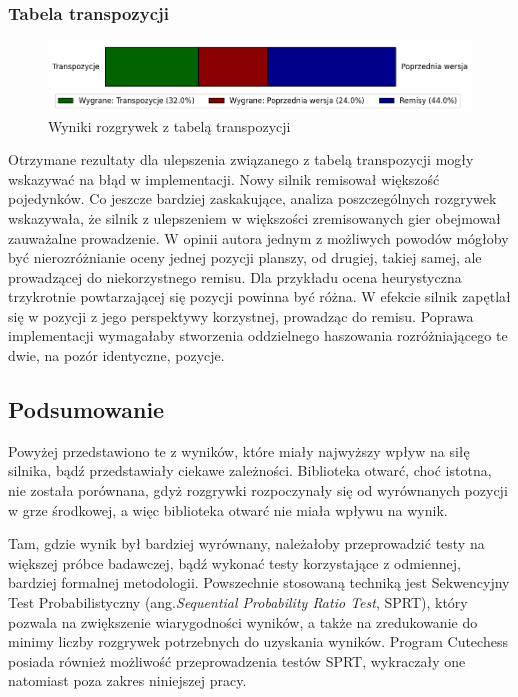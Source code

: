 \subsubsection{Tabela transpozycji}
\begin{figure}[ht]
    \centering
    \includegraphics[width=1\linewidth]{rozdzialy/rozdzial03/1_porownanie-wersji-silnika/rysunki/wyniki-transpozycje}
    \caption{Wyniki rozgrywek z tabelą transpozycji}
    \label{fig:wyniki-transpozycje}
\end{figure}
Otrzymane rezultaty dla ulepszenia związanego z tabelą transpozycji mogły wskazywać na błąd w implementacji.
Nowy silnik remisował większość pojedynków.
Co jeszcze bardziej zaskakujące, analiza poszczególnych rozgrywek wskazywała, że silnik z ulepszeniem w większości zremisowanych gier obejmował zauważalne prowadzenie.
W opinii autora jednym z możliwych powodów mógłoby być nierozróżnianie oceny jednej pozycji planszy, od drugiej, takiej samej, ale prowadzącej do niekorzystnego remisu.
Dla przykładu ocena heurystyczna trzykrotnie powtarzającej się pozycji powinna być różna.
W efekcie silnik zapętlał się w pozycji z jego perspektywy korzystnej, prowadząc do remisu.
Poprawa implementacji wymagałaby stworzenia oddzielnego haszowania rozróżniającego te dwie, na pozór identyczne, pozycje.


\subsection{Podsumowanie}\label{subsec:podsumowanie}
Powyżej przedstawiono te z wyników, które miały najwyższy wpływ na siłę silnika, bądź przedstawiały ciekawe zależności.
Biblioteka otwarć, choć istotna, nie została porównana, gdyż rozgrywki rozpoczynały się od wyrównanych pozycji w grze środkowej, a więc biblioteka otwarć nie miała wpływu na wynik.

Tam, gdzie wynik był bardziej wyrównany, należałoby przeprowadzić testy na większej próbce badawczej, bądź wykonać testy korzystające z odmiennej, bardziej formalnej metodologii.
Powszechnie stosowaną techniką jest Sekwencyjny Test Probabilistyczny (ang.\~\emph{Sequential Probability Ratio Test}, SPRT), który pozwala na zwiększenie wiarygodności wyników, a także na zredukowanie do minimy liczby rozgrywek potrzebnych do uzyskania wyników. \cite*{wiki-sprt}
Program Cutechess posiada również możliwość przeprowadzenia testów SPRT, wykraczały one natomiast poza zakres niniejszej pracy.


